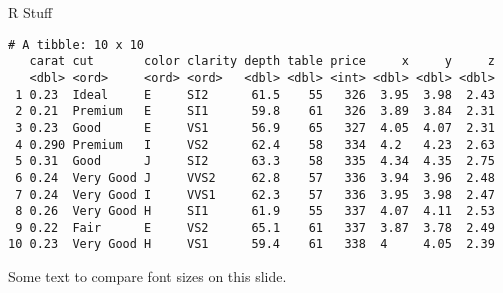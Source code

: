 \documentclass[10pt,ignorenonframetext,,aspectratio=149]{beamer}
\newenvironment{Shaded}{\begin{snugshade}}{\end{snugshade}}
\newcommand{\DataTypeTok}[1]{\textcolor[rgb]{0.16,0.50,0.73}{#1}}
\newcommand{\DecValTok}[1]{\textcolor[rgb]{0.96,0.45,0.00}{#1}}
\newcommand{\KeywordTok}[1]{\textcolor[rgb]{0.81,0.81,0.76}{\textbf{#1}}}
\newcommand{\NormalTok}[1]{\textcolor[rgb]{0.81,0.81,0.76}{#1}}
\newcommand{\OperatorTok}[1]{\textcolor[rgb]{0.81,0.81,0.76}{#1}}
\newcommand{\StringTok}[1]{\textcolor[rgb]{0.96,0.31,0.31}{#1}}
\begin{document}
\begin{frame}{R Stuff}
\protect\hypertarget{r-stuff}{}
\begin{verbatim}
# A tibble: 10 x 10
   carat cut       color clarity depth table price     x     y     z
   <dbl> <ord>     <ord> <ord>   <dbl> <dbl> <int> <dbl> <dbl> <dbl>
 1 0.23  Ideal     E     SI2      61.5    55   326  3.95  3.98  2.43
 2 0.21  Premium   E     SI1      59.8    61   326  3.89  3.84  2.31
 3 0.23  Good      E     VS1      56.9    65   327  4.05  4.07  2.31
 4 0.290 Premium   I     VS2      62.4    58   334  4.2   4.23  2.63
 5 0.31  Good      J     SI2      63.3    58   335  4.34  4.35  2.75
 6 0.24  Very Good J     VVS2     62.8    57   336  3.94  3.96  2.48
 7 0.24  Very Good I     VVS1     62.3    57   336  3.95  3.98  2.47
 8 0.26  Very Good H     SI1      61.9    55   337  4.07  4.11  2.53
 9 0.22  Fair      E     VS2      65.1    61   337  3.87  3.78  2.49
10 0.23  Very Good H     VS1      59.4    61   338  4     4.05  2.39
\end{verbatim}

Some text to compare font sizes on this slide.

\begin{Shaded}
\end{Shaded}


\end{frame}
\end{document}

